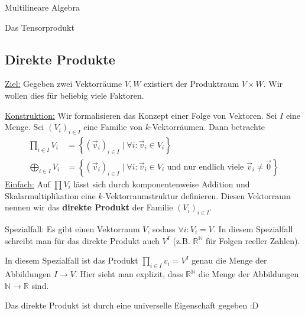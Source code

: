 \documentclass{report}
\newcommand*{\newpar}{\par\vspace{\baselineskip}\noindent}
\newcommand{\tbf}[1]{\textbf{#1}}
\newcommand{\ul}[1]{\underline{#1}}
\newcommand{\bN}{\mathbb{N}}
\newcommand{\bR}{\mathbb{R}}
\newcommand{\vv}{\vec{v}}
\newcommand{\vz}{\vec{0}}
\begin{document}
\begin{chapter}{Multilineare Algebra}
\begin{section}{Das Tensorprodukt}
  \subsection{Direkte Produkte}
  \ul{Ziel:} Gegeben zwei Vektorräume $V, W$ existiert der Produktraum $V \times W$. Wir wollen dies für beliebig viele Faktoren.
  \newpar
  \ul{Konstruktion:} Wir formalisieren das Konzept einer Folge von Vektoren. Sei $I$ eine Menge. Sei $(V_i)_{i \in I}$ eine Familie von $k$-Vektorräumen. Dann betrachte
  \begin{align*}
   \prod_{i \in I} V_i &= \left\{(\vv_i)_{i \in I} \mid \forall i : \vv_i \in V_i\right\}\\
   \bigoplus_{i \in I} V_i &= \left\{(\vv_i)_{i \in I} \mid \forall i : \vv_i \in V_i \text{ und nur endlich viele } \vv_i \neq \vz \right\}
  \end{align*}
  \ul{Einfach:} Auf $\prod V_i$ lässt sich durch komponentenweise Addition und Skalarmultiplikation eine $k$-Vektorraumstruktur definieren. Diesen Vektorraum nennen wir das \tbf{direkte Produkt} der Familie $(V_i)_{i \in I}$.
  \newpar
  Spezialfall: Es gibt einen Vektorraum $V$, sodass $\forall i : V_i = V$. In diesem Spezialfall schreibt man für das direkte Produkt auch $V^I$ (z.B. $\bR^\bN$ für Folgen reeller Zahlen).
  \newpar
  \begin{beobachtung}
   In diesem Spezialfall ist das Produkt $\prod_{i \in I} v_i = V^I$ genau die Menge der Abbildungen $I \to V$. Hier sieht man explizit, dass $\bR^\bN$ die Menge der Abbildungen $\bN \to \bR$ sind.
  \end{beobachtung}
   \noindent Das direkte Produkt ist durch eine universelle Eigenschaft gegeben :D
   

\end{section}
\end{chapter}
\end{document}
